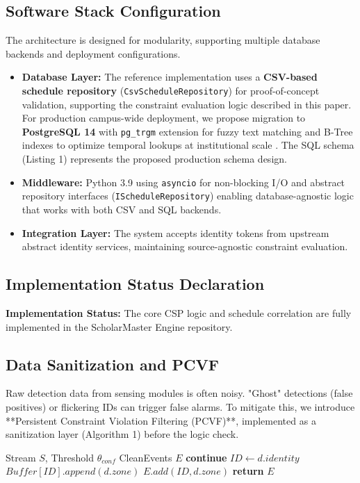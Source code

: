 \documentclass[conference]{IEEEtran}
\providecommand{\RETURN}{\STATE \textbf{return} }
\begin{document}
\subsection{Software Stack Configuration}
The architecture is designed for modularity, supporting multiple database backends and deployment configurations.

\begin{itemize}
    \item \textbf{Database Layer:} The reference implementation uses a \textbf{CSV-based schedule repository} (\texttt{CsvScheduleRepository}) for proof-of-concept validation, supporting the constraint evaluation logic described in this paper. For production campus-wide deployment, we propose migration to \textbf{PostgreSQL 14} with \texttt{pg\_trgm} extension for fuzzy text matching and B-Tree indexes to optimize temporal lookups at institutional scale \cite{b18}. The SQL schema (Listing 1) represents the proposed production schema design.
    \item \textbf{Middleware:} Python 3.9 using \texttt{asyncio} for non-blocking I/O and abstract repository interfaces (\texttt{IScheduleRepository}) enabling database-agnostic logic that works with both CSV and SQL backends.
    \item \textbf{Integration Layer:} The system accepts identity tokens from upstream abstract identity services, maintaining source-agnostic constraint evaluation.
\end{itemize}

\subsection{Implementation Status Declaration}
\textbf{Implementation Status:} The core CSP logic and schedule correlation are fully implemented in the ScholarMaster Engine repository.

\subsection{Data Sanitization and PCVF}
Raw detection data from sensing modules is often noisy. "Ghost" detections (false positives) or flickering IDs can trigger false alarms. To mitigate this, we introduce **Persistent Constraint Violation Filtering (PCVF)**, implemented as a sanitization layer (Algorithm 1) before the logic check.

\begin{algorithm}[H]
\caption{Detection Stream Sanitization and Persistent Constraint Violation Filtering (PCVF)}
\begin{algorithmic}[1]
\REQUIRE Stream $S$, Threshold $\theta_{conf}$
\ENSURE CleanEvents $E$
\STATE \textbf{continue} 
\ENDIF
\STATE $ID \leftarrow d.identity$
\STATE $Buffer[ID].append(d.zone)$
\STATE $E.add(ID, d.zone)$
\ENDIF
\ENDFOR
\ENDFOR
\RETURN $E$
\end{algorithmic}
\label{alg:sanitization}
\end{algorithm}
\end{document}

